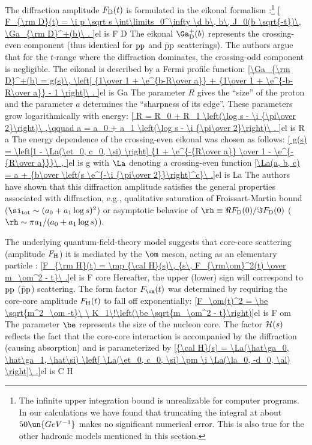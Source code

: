 The diffraction amplitude $F_{\rm D}(t)$ is formulated in the eikonal formalism :\footnote{%
The infinite upper integration bound is unrealizable for computer programs. In our calculations we have found that truncating the integral at about $50\un{GeV^{-1}}$ makes no significant numerical error. This is also true for the other hadronic models mentioned in this section.
}
\eqref{
	F_{\rm D}(t) = \i p \sqrt s \int\limits_0^\infty \d b\, b\, J_0(b \sqrt{-t})\, \Ga_{\rm D}^+(b)\ .
}{el is F D}
The eikonal $\Ga_{\rm D}^+(b)$ represents the crossing-even component (thus identical for $\rm pp$ and $\rm\bar pp$ scatterings). The authors argue that for the $t$-range where the diffraction dominates, the crossing-odd component is negligible. The eikonal is described by a Fermi profile function:
\eqref{\Ga_{\rm D}^+(b) =
	g(s)\, \left[
		{1\over 1 + \e^{b-R\over a}}
		+ {1\over 1 + \e^{-b-R\over a}}
		- 1
	\right]\ .
}{el is Ga}
The parameter $R$ gives the ``size'' of the proton and the parameter $a$ determines the ``sharpness of its edge''. These parameters grow logarithmically with energy:
\eqref{
	R = R_0 + R_1 \left(\log s - \i {\pi\over 2}\right)\ ,\qquad
	a = a_0 + a_1 \left(\log s - \i {\pi\over 2}\right)\ .
}{el is R a}
The energy dependence of the crossing-even eikonal was chosen as follows:
\eqref{
	g(s) =  \left[1 - \La(\et_0, c_0, \si) \right] {1 + \e^{-{R\over a}} \over 1 - \e^{- {R\over a}}}\ ,
}{el is g}
with $\La$ denoting a crossing-even function
\eqref{\La(a, b, c) = a + {b\over \left(s \e^{-\i {\pi\over 2}}\right)^c}\ .}{el is La}
The authors have shown  that this diffraction amplitude satisfies the general properties associated with diffraction, e.g., qualitative saturation of Froissart-Martin bound ($\si_{\rm tot} \sim (a_0 + a_1\log s)^2$) or asymptotic behavior of $\rh \equiv \Re F_{\rm D}(0) / \Im F_{\rm D}(0)$ ($\rh \sim \pi a_1 / (a_0 + a_1 \log s)$).

The underlying quantum-field-theory model suggests that core-core scattering (amplitude $F_{\rm H}$) it is mediated by the $\rm\om$ meson, acting as an elementary particle :
\eqref{F_{\rm H}(t) = \mp {\cal H}(s)\, {s\, F_{\rm\om}^2(t) \over m_\om^2 - t}\ .}{el is F core}
Hereafter, the upper (lower) sign will correspond to $\rm pp$ ($\rm\bar pp$) scattering. The form factor $F_\om(t)$ was determined by requiring the core-core amplitude $F_{\rm H}(t)$ to fall off exponentially:
\eqref{F_\om(t)^2 = \be \sqrt{m^2_\om -t}\ \ K_1\!\left(\be \sqrt{m_\om^2 - t}\right)}{el is F om}
The parameter $\be$ represents the size of the nucleon core. The factor ${\cal H}(s)$ reflects the fact that the core-core interaction is accompanied by the diffraction (causing absorption) and is parameterized by
\eqref{{\cal H}(s) = \La(\hat\ga_0, \hat\ga_1, \hat\si) \left[ \La(\et_0, c_0, \si) \pm \i \La(\la_0, -d_0, \al) \right]\ .}{el is C H}

